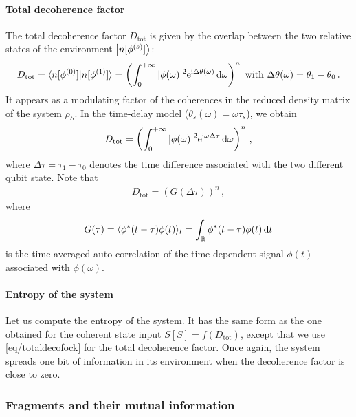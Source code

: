 \paragraph*{Total decoherence factor}
The total decoherence factor $D_{\text{tot}}$ is given by the overlap
between the two relative states of the environment 
$\ket{n[\phi^{(s)}]}$:
%
\begin{align}
D_{\text{tot}} = \langle n[\phi^{(0)}] | n[\phi^{(1)}] \rangle
= 
	\left(
	\int_0^{+\infty} 
		|\phi(\omega)|^2 \mathrm{e}^{\mathrm{i}\Delta\theta(\omega)}
	\,\mathrm{d}\omega
	\right)^n
\text{ with }
\Delta\theta(\omega)  = \theta_1 - \theta_0
\,.
\end{align}
It appears as a modulating factor of the coherences in the reduced
density matrix of the system $\rho_S$. In the time-delay model
($\theta_s(\omega) = \omega \tau_s$), we obtain 
%
\begin{align}
D_{\text{tot}} = 
	\left(
	\int_0^{+\infty} 
		|\phi(\omega)|^2 \mathrm{e}^{\mathrm{i}\omega\Delta\tau}
	\,\mathrm{d}\omega
	\right)^n
\,,
\label{eq/totaldecofock}
\end{align}
where $\Delta \tau=\tau_1-\tau_0$ denotes the time difference associated with
the two different qubit state. Note that
%
\begin{align}
D_{\text{tot}} = (G(\Delta\tau))^n
\,,
\end{align}
where
\begin{align}
G(\tau) = \langle \phi^*(t-\tau)\phi(t) \rangle_t
= \int_{\mathbb{R}} \phi^*(t-\tau)\phi(t) \,\mathrm{d} t
\end{align}
is the time-averaged auto-correlation of the time dependent signal
$\phi(t)$ associated
with $\phi(\omega)$.

\paragraph*{Entropy of the system} Let us compute the entropy of the
system. 
It has the same form
as the one obtained for the coherent state input 
$S[S] = f(D_{\text{tot}})$, except that we use 
\cref{eq/totaldecofock} for the total decoherence factor. Once again,
the system spreads one bit of information in its environment when the decoherence
factor is close to zero.

\subsubsection{Fragments and their mutual information}

